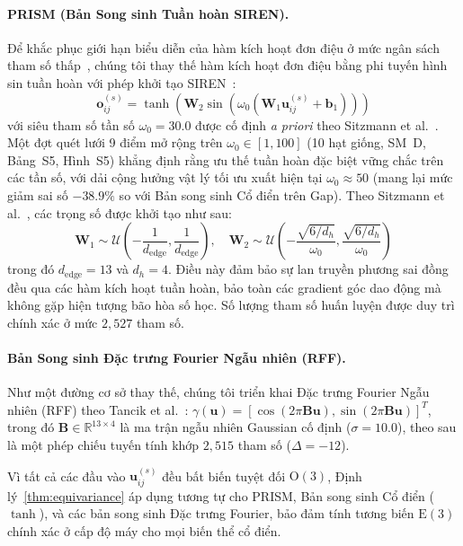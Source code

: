 \documentclass[10pt,twocolumn,letterpaper]{article}
\begin{document}
\paragraph{PRISM (Bản Song sinh Tuần hoàn SIREN).}
Để khắc phục giới hạn biểu diễn của hàm kích hoạt đơn điệu ở mức ngân sách tham số thấp~\cite{rahaman2019spectral, sitzmann2020siren}, chúng tôi thay thế hàm kích hoạt đơn điệu bằng phi tuyến hình sin tuần hoàn với phép khởi tạo SIREN~\cite{sitzmann2020siren}:
\begin{equation}
    \mathbf{o}_{ij}^{(s)} = \tanh\left(\mathbf{W}_2 \sin\left(\omega_0 (\mathbf{W}_1 \mathbf{u}_{ij}^{(s)} + \mathbf{b}_1)\right)\right)
\end{equation}
với siêu tham số tần số $\omega_0 = 30.0$ được cố định \textit{a priori} theo Sitzmann et al.~\cite{sitzmann2020siren}. Một đợt quét lưới 9 điểm mở rộng trên $\omega_0 \in [1, 100]$ (10 hạt giống, SM~D, Bảng~S5, Hình~S5) khẳng định rằng ưu thế tuần hoàn đặc biệt vững chắc trên các tần số, với dải cộng hưởng vật lý tối ưu xuất hiện tại $\omega_0 \approx 50$ (mang lại mức giảm sai số $-38.9\%$ so với Bản song sinh Cổ điển trên Gap).
Theo Sitzmann et al.~\cite{sitzmann2020siren}, các trọng số được khởi tạo như sau:
\begin{equation}
    \mathbf{W}_1 \sim \mathcal{U}\left(-\frac{1}{d_{\mathrm{edge}}}, \frac{1}{d_{\mathrm{edge}}}\right), \quad \mathbf{W}_2 \sim \mathcal{U}\left(-\frac{\sqrt{6/d_h}}{\omega_0}, \frac{\sqrt{6/d_h}}{\omega_0}\right)
\end{equation}
trong đó $d_{\mathrm{edge}} = 13$ và $d_h = 4$.
Điều này đảm bảo sự lan truyền phương sai đồng đều qua các hàm kích hoạt tuần hoàn, bảo toàn các gradient góc dao động mà không gặp hiện tượng bão hòa số học. Số lượng tham số huấn luyện được duy trì chính xác ở mức $2{,}527$ tham số.

\paragraph{Bản Song sinh Đặc trưng Fourier Ngẫu nhiên (RFF).}
Như một đường cơ sở thay thế, chúng tôi triển khai Đặc trưng Fourier Ngẫu nhiên (RFF) theo Tancik et al.~\cite{tancik2020fourier}:
$\gamma(\mathbf{u}) = [\cos(2\pi \mathbf{B}\mathbf{u}), \sin(2\pi \mathbf{B}\mathbf{u})]^T$, trong đó $\mathbf{B} \in \mathbb{R}^{13 \times 4}$ là ma trận ngẫu nhiên Gaussian cố định ($\sigma = 10.0$), theo sau là một phép chiếu tuyến tính khớp $2{,}515$ tham số ($\Delta = -12$).

Vì tất cả các đầu vào $\mathbf{u}_{ij}^{(s)}$ đều bất biến tuyệt đối $\mathrm{O}(3)$, Định lý~\ref{thm:equivariance} áp dụng tương tự cho PRISM, Bản song sinh Cổ điển ($\tanh$), và các bản song sinh Đặc trưng Fourier, bảo đảm tính tương biến $\mathrm{E}(3)$ chính xác ở cấp độ máy cho mọi biến thể cổ điển.
\end{document}
